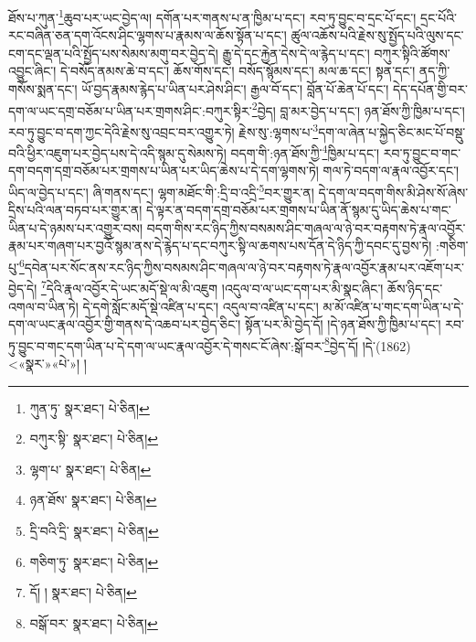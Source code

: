 ཐོས་པ་ཀུན་\footnote{ཀུན་ཏུ་  སྣར་ཐང་།  པེ་ཅིན། }ཆུབ་པར་ཡང་བྱེད་ལ། དགོན་པར་གནས་པ་ན་ཁྱིམ་པ་དང་། རབ་ཏུ་བྱུང་བ་དྲང་པོ་དང་། དྲང་པོའི་རང་བཞིན་ཅན་དག་འོངས་ཤིང་ལྷགས་པ་རྣམས་ལ་ཆོས་སྟོན་པ་དང་། ཚུལ་འཆོས་པའི་རྗེས་སུ་སྤྱོད་པའི་ལུས་དང་ངག་དང་ལྡན་པའི་སྤྱོད་པས་སེམས་མགུ་བར་བྱེད་དེ། རྒྱུ་དེ་དང་རྐྱེན་དེས་དེ་ལ་རྙེད་པ་དང་། བཀུར་སྟིའི་ཚོགས་འབྱུང་ཞིང་། དེ་བསོད་ནམས་ཆེ་བ་དང་། ཆོས་གོས་དང་། བསོད་སྙོམས་དང་། མལ་ཆ་དང་། སྟན་དང་། ནད་ཀྱི་གསོས་སྨན་དང་། ཡོ་བྱད་རྣམས་རྙེད་པ་ཡིན་པར་ཤེས་ཤིང་། རྒྱལ་བོ་དང་། བློན་པོ་ཆེན་པོ་དང་། དེད་དཔོན་གྱི་བར་དག་ལ་ཡང་དགྲ་བཅོམ་པ་ཡིན་པར་གྲགས་ཤིང་:བཀུར་སྟིར་\footnote{བཀུར་སྟི་  སྣར་ཐང་།  པེ་ཅིན། }བྱེད། བླ་མར་བྱེད་པ་དང་། ཉན་ཐོས་ཀྱི་ཁྱིམ་པ་དང་། རབ་ཏུ་བྱུང་བ་དག་ཀྱང་དེའི་རྗེས་སུ་འབྲང་བར་འགྱུར་ཏེ། རྗེས་སུ་:ལྷགས་པ་\footnote{ལྷག་པ་  སྣར་ཐང་།  པེ་ཅིན། }དག་ལ་ཞེན་པ་སྐྱེད་ཅིང་མང་པོ་བསྡུ་བའི་ཕྱིར་འཇུག་པར་བྱེད་པས་དེ་འདི་སྙམ་དུ་སེམས་ཏེ། བདག་གི་:ཉན་ཐོས་ཀྱི་\footnote{ཉན་ཐོས་  སྣར་ཐང་།  པེ་ཅིན། }ཁྱིམ་པ་དང་། རབ་ཏུ་བྱུང་བ་གང་དག་བདག་དགྲ་བཅོམ་པར་གྲགས་པ་ཡིན་པར་ཡིད་ཆེས་པ་དེ་དག་ལྷགས་ཏེ། གལ་ཏེ་བདག་ལ་རྣལ་འབྱོར་དང་། ཡིད་ལ་བྱེད་པ་དང་། ཞི་གནས་དང་། ལྷག་མཐོང་གི་:དྲི་བ་འདྲི་\footnote{དྲི་བའི་དྲི་  སྣར་ཐང་།  པེ་ཅིན། }བར་གྱུར་ན། དེ་དག་ལ་བདག་གིས་མི་ཤེས་སོ་ཞེས་དྲིས་པའི་ལན་བཏབ་པར་གྱུར་ན། དེ་ལྟར་ན་བདག་དགྲ་བཅོམ་པར་གྲགས་པ་ཡིན་ནོ་སྙམ་དུ་ཡིད་ཆེས་པ་གང་ཡིན་པ་དེ་ཉམས་པར་འགྱུར་བས། བདག་གིས་རང་ཉིད་ཀྱིས་བསམས་ཤིང་གཞལ་ལ་ཉེ་བར་བརྟགས་ཏེ་རྣལ་འབྱོར་རྣམ་པར་གཞག་པར་བྱའོ་སྙམ་ནས་དེ་རྙེད་པ་དང་བཀུར་སྟི་ལ་ཆགས་པས་དོན་དེ་ཉིད་ཀྱི་དབང་དུ་བྱས་ཏེ། :གཅིག་པུ་\footnote{གཅིག་ཏུ་  སྣར་ཐང་།  པེ་ཅིན། }དབེན་པར་སོང་ནས་རང་ཉིད་ཀྱིས་བསམས་ཤིང་གཞལ་ལ་ཉེ་བར་བརྟགས་ཏེ་རྣལ་འབྱོར་རྣམ་པར་འཇོག་པར་བྱེད་དེ། \footnote{དོ། །   སྣར་ཐང་།  པེ་ཅིན། }དེའི་རྣལ་འབྱོར་དེ་ཡང་མདོ་སྡེ་ལ་མི་འཇུག །འདུལ་བ་ལ་ཡང་དག་པར་མི་སྣང་ཞིང་། ཆོས་ཉིད་དང་འགལ་བ་ཡིན་ཏེ། དེ་དགེ་སློང་མདོ་སྡེ་འཛིན་པ་དང་། འདུལ་བ་འཛིན་པ་དང་། མ་མོ་འཛིན་པ་གང་དག་ཡིན་པ་དེ་དག་ལ་ཡང་རྣལ་འབྱོར་གྱི་གནས་དེ་འཆབ་པར་བྱེད་ཅིང་། སྟོན་པར་མི་བྱེད་དོ། །དེ་ཉན་ཐོས་ཀྱི་ཁྱིམ་པ་དང་། རབ་ཏུ་བྱུང་བ་གང་དག་ཡིན་པ་དེ་དག་ལ་ཡང་རྣལ་འབྱོར་དེ་གསང་ངོ་ཞེས་:སྒོ་བར་\footnote{བསྒོ་བར་  སྣར་ཐང་།  པེ་ཅིན། }བྱེད་དོ། །དེ་(1862) <«སྣར་»«པེ་»། །
